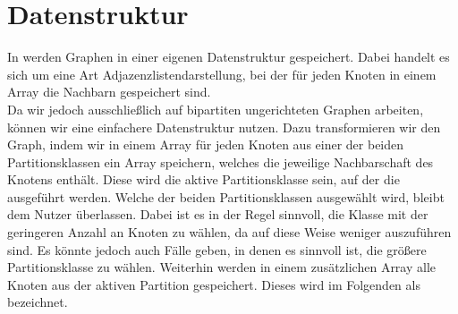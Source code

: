 
\section{Datenstruktur}
\label{sec:datenstruktur}
In \nk{} werden Graphen in einer eigenen Datenstruktur gespeichert.
Dabei handelt es sich um eine Art Adjazenzlistendarstellung, bei der für jeden Knoten 
in einem Array die Nachbarn gespeichert sind. 
\\

Da wir jedoch ausschließlich auf bipartiten ungerichteten Graphen
arbeiten, können wir eine einfachere Datenstruktur nutzen. 
Dazu transformieren wir
den Graph, indem wir in einem Array für jeden Knoten aus einer der beiden Partitionsklassen
ein Array speichern, welches die jeweilige Nachbarschaft des Knotens enthält.
Diese
wird die aktive Partitionsklasse sein, auf der die  ausgeführt werden.
Welche der beiden Partitionsklassen ausgewählt wird, bleibt dem Nutzer überlassen. 
Dabei ist es in der Regel sinnvoll, die Klasse mit der geringeren Anzahl an Knoten zu wählen, da auf diese
Weise weniger  auszuführen sind. Es könnte jedoch auch Fälle geben, in denen es 
sinnvoll ist, die größere Partitionsklasse zu wählen.
Weiterhin werden in einem zusätzlichen Array alle Knoten aus der aktiven Partition gespeichert.
Dieses wird im Folgenden als \partvek{} bezeichnet. 
\\

